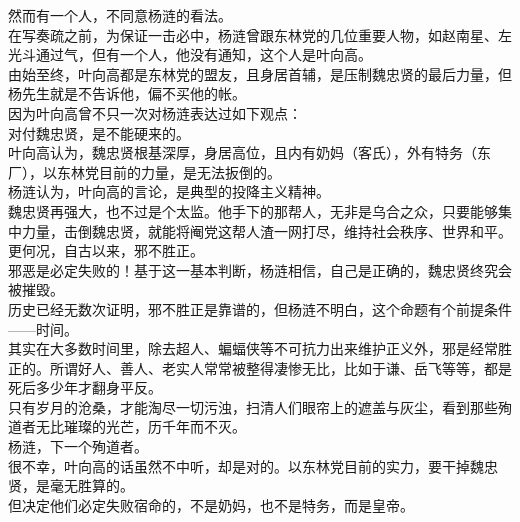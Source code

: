 \begin{multicols}{\theparacolNo}
然而有一个人，不同意杨涟的看法。\\

在写奏疏之前，为保证一击必中，杨涟曾跟东林党的几位重要人物，如赵南星、左光斗通过气，但有一个人，他没有通知，这个人是叶向高。\\

由始至终，叶向高都是东林党的盟友，且身居首辅，是压制魏忠贤的最后力量，但杨先生就是不告诉他，偏不买他的帐。\\

因为叶向高曾不只一次对杨涟表达过如下观点：\\

对付魏忠贤，是不能硬来的。\\

叶向高认为，魏忠贤根基深厚，身居高位，且内有奶妈（客氏），外有特务（东厂），以东林党目前的力量，是无法扳倒的。\\

杨涟认为，叶向高的言论，是典型的投降主义精神。\\

魏忠贤再强大，也不过是个太监。他手下的那帮人，无非是乌合之众，只要能够集中力量，击倒魏忠贤，就能将阉党这帮人渣一网打尽，维持社会秩序、世界和平。\\

更何况，自古以来，邪不胜正。\\

邪恶是必定失败的！基于这一基本判断，杨涟相信，自己是正确的，魏忠贤终究会被摧毁。\\

历史已经无数次证明，邪不胜正是靠谱的，但杨涟不明白，这个命题有个前提条件——时间。\\

其实在大多数时间里，除去超人、蝙蝠侠等不可抗力出来维护正义外，邪是经常胜正的。所谓好人、善人、老实人常常被整得凄惨无比，比如于谦、岳飞等等，都是死后多少年才翻身平反。\\

只有岁月的沧桑，才能淘尽一切污浊，扫清人们眼帘上的遮盖与灰尘，看到那些殉道者无比璀璨的光芒，历千年而不灭。\\

杨涟，下一个殉道者。\\

很不幸，叶向高的话虽然不中听，却是对的。以东林党目前的实力，要干掉魏忠贤，是毫无胜算的。\\

但决定他们必定失败宿命的，不是奶妈，也不是特务，而是皇帝。\\


\end{multicols}
